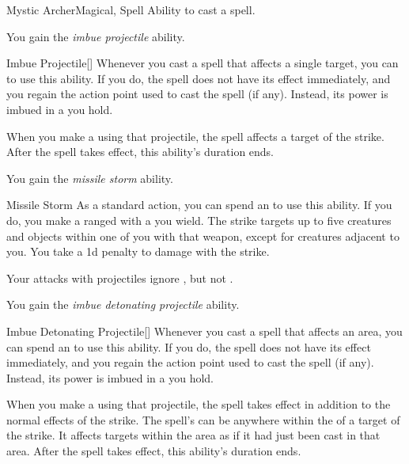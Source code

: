     \begin{feat}{Mystic Archer}{Magical, Spell}
        \featpre Ability to cast a spell.

         You gain the \textit{imbue projectile} ability.
        \begin{ability}{Imbue Projectile}[]
            Whenever you cast a spell that affects a single target, you can  to use this ability.
            If you do, the spell does not have its effect immediately, and you regain the action point used to cast the spell (if any).
            Instead, its power is imbued in a  you hold. 

            When you make a  using that projectile, the spell affects a target of the strike.
            After the spell takes effect, this ability's duration ends.
        \end{ability}

         You gain the \textit{missile storm} ability.
        \begin{ability}{Missile Storm}
            As a standard action, you can spend an  to use this ability.
            If you do, you make a ranged  with a  you wield.
            The strike targets up to five creatures and objects within one  of you with that weapon, except for creatures adjacent to you.
            You take a \minus1d penalty to damage with the strike.
        \end{ability}

         Your attacks with projectiles ignore , but not .

         You gain the \textit{imbue detonating projectile} ability.
        \begin{ability}{Imbue Detonating Projectile}[]
            Whenever you cast a spell that affects an area, you can spend an  to use this ability.
            If you do, the spell does not have its effect immediately, and you regain the action point used to cast the spell (if any).
            Instead, its power is imbued in a  you hold. 

            When you make a  using that projectile, the spell takes effect in addition to the normal effects of the strike.
            The spell's  can be anywhere within the  of a target of the strike.
            It affects targets within the area as if it had just been cast in that area.
            After the spell takes effect, this ability's duration ends.
        \end{ability}


\end{feat}
